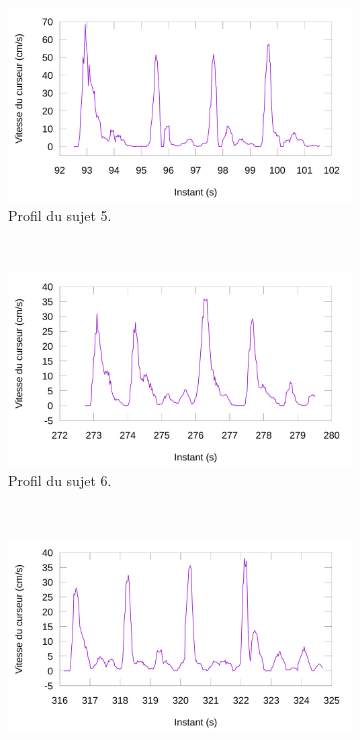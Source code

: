 	\begin{figure}[htb]
		\centering
		\begin{subfigure}[t]{\subImgWlineplot}
			\centering
			\includegraphics[width=\textwidth]{figures/ch4/subject_05_rect_219_smoothed}
			\caption{Profil du sujet 5.}
			\label{fig:rectProfile5}
		\end{subfigure}
		~
		\begin{subfigure}[t]{\subImgWlineplot}
			\centering
			\includegraphics[width=\textwidth]{figures/ch4/subject_06_rect_219_smoothed}
			\caption{Profil du sujet 6.}
			\label{fig:rectProfile6}
		\end{subfigure}
		~
		\begin{subfigure}[t]{\subImgWlineplot}
			\centering
			\includegraphics[width=\textwidth]{figures/ch4/subject_08_rect_219_smoothed}

\end{subfigure}
\end{figure}

